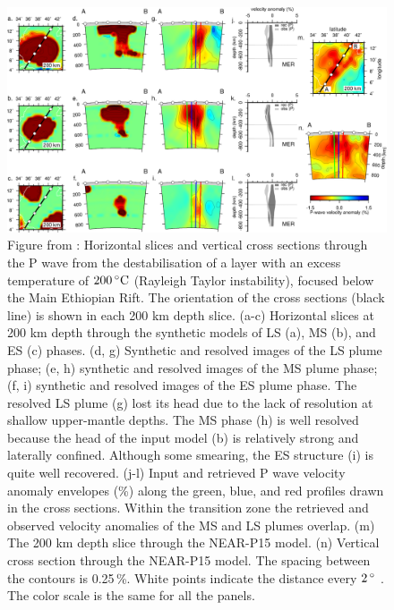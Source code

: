 \begin{figure}
\includegraphics[width=\textwidth]{./figures/ch2-tomography.png}
\caption{Figure from \cite{civiero-etal-2019}: Horizontal slices and vertical cross sections through the P wave from the destabilisation of a layer with an excess temperature of $200\rm\,^{\circ}C$ (Rayleigh Taylor instability), focused below the Main Ethiopian Rift. The orientation of the cross sections (black line) is shown in each 200 km depth slice. (a-c) Horizontal slices at 200 km depth through the synthetic models of LS (a), MS (b), and ES (c) phases. (d, g) Synthetic and resolved images of the LS plume phase; (e, h) synthetic and resolved images of the MS plume phase; (f, i) synthetic and resolved images of the ES plume phase. The resolved LS plume (g) lost its head due to the lack of resolution at shallow upper-mantle depths. The MS phase (h) is well resolved because the head of the input model (b) is relatively strong and laterally confined. Although some smearing, the ES structure (i) is quite well recovered. (j-l) Input and retrieved P wave velocity anomaly envelopes (\%) along the green, blue, and red profiles drawn in the cross sections. Within the transition zone the retrieved and observed velocity anomalies of the MS and LS plumes overlap. (m) The 200 km depth slice through the NEAR-P15 model. (n) Vertical cross section through the NEAR-P15 model. The spacing between the contours is 0.25\,\%. White points indicate the distance every $2\rm\,^{\circ}$ . The color scale is the same for all the panels.}
\label{fg:EAR-plumes}
\end{figure}


